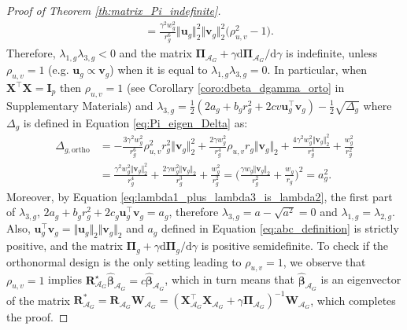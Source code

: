 \documentclass[10pt,a4paper]{amsart}
\newcommand{\Aset}{\mathcal{A}}
\newcommand{\T}{\top}
\def\bI{\mathbf{I}}
\def\bPi{\boldsymbol{\Pi}}
\def\bR{\mathbf{R}}
\def\bW{\mathbf{W}}
\def\bX{\mathbf{X}}
\def\bbeta{\boldsymbol{\beta}}
\def\bu{\boldsymbol{u}}
\def\bv{\boldsymbol{v}}
\begin{document}
\begin{proof}[Proof of Theorem \ref{th:matrix_Pi_indefinite}]
\begin{equation*}
\begin{aligned}
&=\frac{\gamma^2w_g^2}{r_g^6}\Vert\bu_g\Vert_2^2\Vert\bv_g\Vert_2^2\big(\rho_{u,v}^2-1\big).
\end{aligned}
\end{equation*}
Therefore, $\lambda_{1,g}\lambda_{3,g}<0$ and the matrix $\bPi_{\Aset_G}+\gamma\mathrm{d}\bPi_{\Aset_G}/\mathrm{d}\gamma$ is indefinite, unless $\rho_{u,v}=1$ (e.g. $\bu_g\propto\bv_g$) when it is equal to $\lambda_{1,g}\lambda_{3,g}=0$. In particular, when $\bX^{\T}\bX=\bI_p$ then $\rho_{u,v}=1$ (see Corollary \ref{coro:dbeta_dgamma_orto} in Supplementary Materials) and $\lambda_{3,g}=\frac{1}{2}(2a_g+b_g r_g^2+2cv\bu_g^{\T}\bv_g)-\frac{1}{2} \sqrt{\Delta_g}$ where $\Delta_g$ is defined in Equation \eqref{eq:Pi_eigen_Delta} as:
\begin{equation*}
\begin{aligned}
\Delta_{g,\textrm{ortho}}&=-\frac{3\gamma^2w_g^2}{r_g^6}\rho_{u,v}^2r_g^2\Vert\bv_g\Vert_2^2+\frac{2\gamma w_g^2}{r_g^4}\rho_{u,v} r_g\Vert\bv_g\Vert_2+\frac{4\gamma^2w_g^2\Vert\bv_g\Vert_2^2}{r_g^4}+\frac{w_g^2}{r_g^2}\\
&=\frac{\gamma^2w_g^2\Vert\bv_g\Vert_2^2}{r_g^4}+\frac{2\gamma w_g^2\Vert\bv_g\Vert_2}{r_g^3}+\frac{w_g^2}{r_g^2}=\Bigg(\frac{\gamma w_g\Vert\bv_g\Vert_2}{r_g^2}+\frac{w_g}{r_g}\Bigg)^2=a_g^2.
\end{aligned}
\end{equation*}
Moreover, by Equation \eqref{eq:lambda1_plus_lambda3_is_lambda2}, the first part of $\lambda_{3,g}$, $2a_g+b_g r_g^2+2c_g\bu_g^{\T}\bv_g=a_g$, therefore $\lambda_{3,g}=a-\sqrt{a^2}=0$ and $\lambda_{1,g}=\lambda_{2,g}$. Also, $\bu_g^{\T}\bv_g=\Vert\bu_g\Vert_2\Vert\bv_g\Vert_2$ and $a_g$ defined in Equation \eqref{eq:abc_definition} is strictly positive, and the matrix $\bPi_{g} + \gamma \mathrm{d}\bPi_{g}/\mathrm{d}\gamma$ is positive semidefinite. To check if the orthonormal design is the only setting leading to $\rho_{u,v}=1$, we observe that $\rho_{u,v}=1$ implies $\bR_{\Aset_G}^\star\widehat{\bbeta}_{\Aset_G} = c \widehat{\bbeta}_{\Aset_G}$, which in turn means that $\widehat{\bbeta}_{\Aset_G}$ is an eigenvector of the matrix $\bR^*_{\Aset_G} = \bR_{\Aset_G}\bW_{\Aset_G} = (\bX_{\Aset_G}^{\T} \bX_{\Aset_G} + \gamma \bPi_{\Aset_G})^{-1} \bW_{\Aset_G}$, which completes the proof.
\end{proof}
\end{document}
